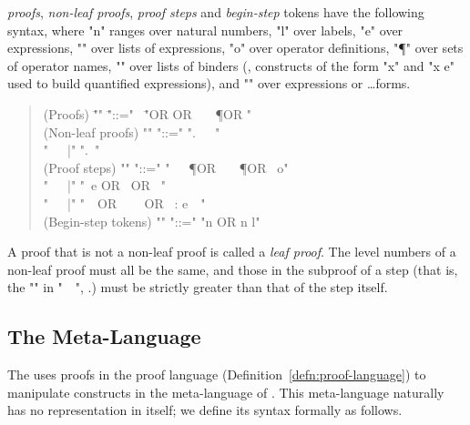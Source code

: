 \documentclass[a4paper]{easychair}
\begin{document}
\begin{defn} \label{defn:proof-language}
  \tlatwo \emph{proofs}, \emph{non-leaf proofs}, \emph{proof steps}
  and \emph{begin-step} tokens have the following syntax, where "n"
  ranges over natural numbers, "l" over labels, "e" over expressions,
  "\Phi" over lists of expressions, "o" over operator definitions,
  "\P" over sets of operator names, "\vec \beta" over lists of binders
  (\ie, constructs of the form "x" and "x \in e" used to build
  quantified expressions), and "\alpha" over expressions or \ASSUME
  \ldots \PROVE forms.
\begin{quote} \itshape
    \begin{tabbing}
      (Proofs) \hspace{4.5em}  \= "\pi" \LSP \= "::=" \ \= "\OBVIOUS OR \OMITTED OR \BY\ \Phi\ \DEFS\ \P OR \Pi" \\
      (Non-leaf proofs) \> "\Pi" \> "::=" \> "\sigma.\ \QED\ \PROOF\ \pi" \\
                   \>             \> "\ \ \ |"  \> "\sigma.\ \tau\quad \Pi" \\
      (Proof steps) \> "\tau" \> "::=" \> "\USE\ \Phi\ \DEFS\ \P OR \HIDE\ \Phi\ \DEFS\ \P OR \DEFINE\ o" \\
                    \>          \> "\ \ \ |" \> "\HAVE\ e OR \TAKE\ \vec \beta OR \WITNESS\ \Phi" \\
                    \>          \> "\ \ \ |" \> "\alpha\ \PROOF\ \pi OR \SUFFICES\ \alpha\ \PROOF\ \pi 
                                                    OR \PICK\ \vec \beta : e\ \PROOF\ \pi" \\
      (Begin-step tokens) \> "\sigma" \> "::=" \> "\s n OR \s n l"
    \end{tabbing}
  \end{quote}
A proof that is not a non-leaf proof is called a \emph{leaf
    proof}. The level numbers of a non-leaf proof must all be the
  same, and those in the subproof of a step (that is, the "\pi" in
  "\alpha\ \PROOF\ \pi", \etc.) must be strictly greater than that of
  the step itself.
\end{defn}

\subsection{The Meta-Language}
\label{apx:context}

The \PM uses proofs in the \tlatwo proof language
(Definition~\ref{defn:proof-language}) to manipulate constructs in the
meta-language of \tlatwo. This meta-language naturally has no
representation in \tlatwo itself; we define its syntax formally as
follows.
\end{document}

